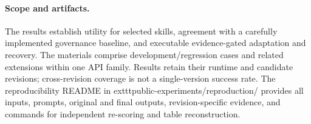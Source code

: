 \paragraph{Scope and artifacts.}
The results establish utility for selected skills, agreement with a carefully
implemented governance baseline, and executable evidence-gated adaptation and
recovery. The materials comprise development/regression cases and related
extensions within one API family. Results retain their runtime and candidate
revisions; cross-revision coverage is not a single-version success rate. The
reproducibility README in 	exttt{public-experiments/reproduction/} provides all
inputs, prompts, original and final outputs, revision-specific evidence, and
commands for independent re-scoring and table reconstruction.
